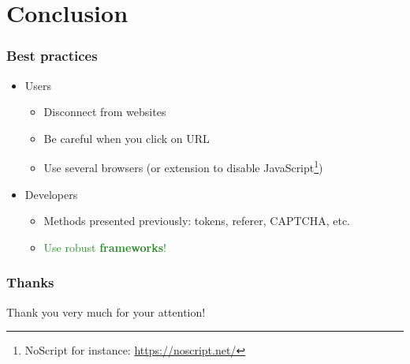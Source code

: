 \documentclass[svgnames]{beamer}
\begin{document}
\section*{Conclusion}
\begin{frame}
  \frametitle{Best practices}
  \begin{itemize}
   \item Users
   \pause
   \begin{itemize}
    \item Disconnect from websites
    \item Be careful when you click on URL %
    \item Use several browsers (or extension to disable JavaScript\footnote{NoScript for instance: \url{https://noscript.net/}})
   \end{itemize}
   \pause
   \item Developers
   \begin{itemize}
    \item Methods presented previously: tokens, referer, CAPTCHA, etc.
    \pause
    \item \textcolor{ForestGreen}{Use robust \textbf{frameworks}!}
   \end{itemize}

  \end{itemize}
\end{frame}


\begin{frame}
  \frametitle{Thanks}
  \begin{center}
    Thank you very much for your attention!
  \end{center}
\end{frame}
\end{document}

